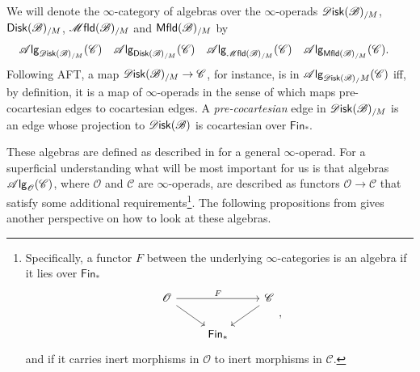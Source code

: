 \documentclass[../text]{subfiles}
\begin{document}
\begin{definition}
    We will denote the $\infty$-category of algebras over the $\infty$-operads $\disk(\bstr)_{/M}$, $\disk[r](\bstr)_{/M}$, $\mfld(\bstr)_{/M}$ and $\mfld[r](\bstr)_{/M}$ by
    \begin{align}
        &\alg{\disk(\bstr)_{/M}} (\catC)& &\alg{\disk[r](\bstr)_{/M}} (\catC)& &\alg{\mfld(\bstr)_{/M}} (\catC)& &\alg{\mfld[r](\bstr)_{/M}} (\catC).&
    \end{align}
    Following AFT, a map $\disk(\bstr)_{/M}\to \catC$, for instance, is in $\alg{\disk(\bstr)_/M}(\catC)$ iff, by definition, it is a map of $\infty$-operads in the sense of \cite[Definition 2.1.2.7]{lurie_ha} which maps pre-cocartesian edges to cocartesian edges. A \emph{pre-cocartesian} edge in $\disk(\bstr)_{/M}$ is an edge whose projection to $\disk(\bstr)$ is cocartesian over $\mathsf{Fin}_\ast$.
\end{definition}

\begin{remark}
    These algebras are defined as described in \cite{lurie_ha} for a general $\infty$-operad. For a superficial understanding what will be most important for us is that algebras $\mathscr{A} \mathsf{lg}_{\mathscr{O}} (\mathscr{C})$, where $\mathscr{O}$ and $\mathscr{C}$ are $\infty$-operads, are described as functors $\mathscr{O} \xrightarrow{} \mathscr{C}$ that satisfy some additional requirements\footnote{Specifically, a functor $F$ between the underlying $\infty$-categories is an algebra if it lies over $\mathsf{Fin}_*$
    \begin{equation}
        \begin{tikzcd}[ampersand replacement=\&]
            \mathscr{O} \arrow[rr, "F"] \arrow[rd] \& \& \mathscr{C} \arrow[ld] \\
            \& \mathsf{Fin}_* \&
        \end{tikzcd},
    \end{equation}
    and if it carries inert morphisms in $\mathscr{O}$ to inert morphisms in $\mathscr{C}$.
    }. The following propositions from \cite{lurie_ha} gives another perspective on how to look at these algebras.
\end{remark}
\end{document}
